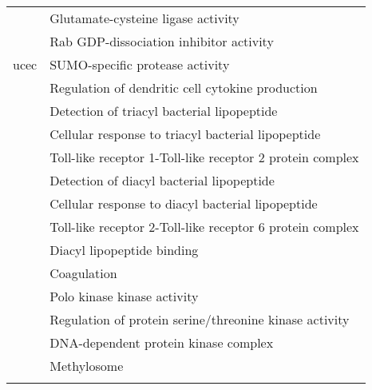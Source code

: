 \begin{appendices}
\begin{longtable}{lp{}}
                                 & Glutamate-cysteine ligase activity                                                              \\
                                 & Rab GDP-dissociation inhibitor activity                                                         \\
	\hline
	\gls{ucec}                   & SUMO-specific protease activity                                                                 \\
                                 & Regulation of dendritic cell cytokine production                                                \\
                                 & Detection of triacyl bacterial lipopeptide                                                      \\
                                 & Cellular response to triacyl bacterial lipopeptide                                              \\
                                 & Toll-like receptor 1-Toll-like receptor 2 protein complex                                       \\
                                 & Detection of diacyl bacterial lipopeptide                                                       \\
                                 & Cellular response to diacyl bacterial lipopeptide                                               \\
                                 & Toll-like receptor 2-Toll-like receptor 6 protein complex                                       \\
                                 & Diacyl lipopeptide binding                                                                      \\
                                 & Coagulation                                                                                     \\
                                 & Polo kinase kinase activity                                                                     \\
                                 & Regulation of protein serine/threonine kinase activity                                          \\
                                 & DNA-dependent protein kinase complex                                                            \\
                                 & Methylosome                                                                                     \\
	\hline
	\hline
	\insertTableNotes
\end{longtable}


\end{appendices}
